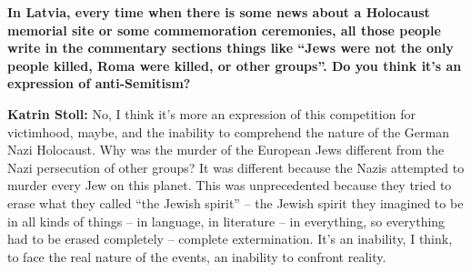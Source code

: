 \textbf{In Latvia, every time when there is some news about a Holocaust memorial site or some commemoration ceremonies, all those people write in the commentary sections things like ``Jews were not the only people killed, Roma were killed, or other groups''. Do you think it’s an expression of anti-Semitism?} 

\textbf{Katrin Stoll:} No, I think it’s more an expression of this competition for victimhood, maybe, and the inability to comprehend the nature of the German Nazi Holocaust. Why was the murder of the European Jews different from the Nazi persecution of other groups? It was different because the Nazis attempted to murder every Jew on this planet. This was unprecedented because they tried to erase what they called ``the Jewish spirit'' – the Jewish spirit they imagined to be in all kinds of things – in language, in literature – in everything, so everything had to be erased completely – complete extermination. It’s an inability, I think, to face the real nature of the events, an inability to confront reality. 




